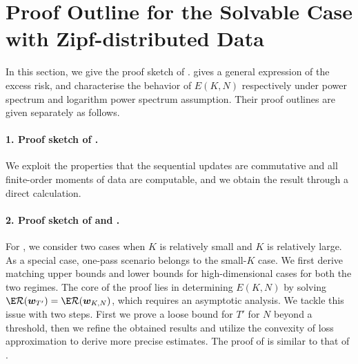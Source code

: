 \section{Proof Outline for the
Solvable Case with Zipf-distributed Data}
In this section, we give the proof sketch of .
 gives a general expression of the excess risk,  and  characterise the behavior of $E(K, N)$ respectively under power spectrum and logarithm power spectrum assumption. 
Their proof outlines are given separately as follows.
\paragraph{1. Proof sketch of .} We exploit the properties that the sequential updates are commutative and all finite-order moments of data are computable, and we obtain the result through a direct calculation.

\paragraph{2. Proof sketch of  and .} For , we consider two cases when $K$ is relatively small and $K$ is relatively large. As a special case, one-pass scenario belongs to the small-$K$ case.
We first derive matching upper bounds and lower bounds for high-dimensional cases for both the two regimes. The core of the proof lies in determining $E(K, N)$ by solving $\E\cR(\vw_{T'}) = \E\cR(\vw_{K, N})$, which requires an asymptotic analysis. We tackle this issue with two steps. First we prove a loose bound for $T'$ for $N$ beyond a threshold, then we refine the obtained results and utilize the convexity of loss approximation to derive more precise estimates. The proof of  is similar to that of .

